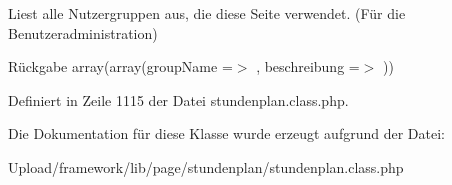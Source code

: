 Liest alle Nutzergruppen aus, die diese Seite verwendet. (Für die Benutzeradministration) \begin{DoxyReturn}{Rückgabe}
array(array(\textquotesingle{}group\+Name\textquotesingle{} =$>$ \textquotesingle{}\textquotesingle{}, \textquotesingle{}beschreibung\textquotesingle{} =$>$ \textquotesingle{}\textquotesingle{})) 
\end{DoxyReturn}


Definiert in Zeile 1115 der Datei stundenplan.\+class.\+php.



Die Dokumentation für diese Klasse wurde erzeugt aufgrund der Datei\+:\begin{DoxyCompactItemize}
\item 
Upload/framework/lib/page/stundenplan/stundenplan.\+class.\+php\end{DoxyCompactItemize}
